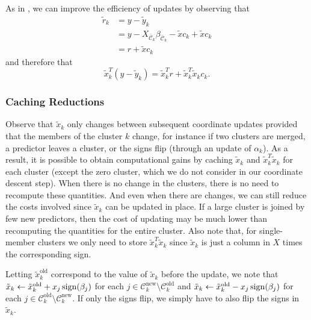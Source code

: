 As in \textcite{friedman2010}, we can improve the efficiency of updates by observing that
\begin{equation*}
  \begin{aligned}
    \tilde r_k & = y - \tilde y_k                                                                       \\
               & = y - X_{\bar{\mathcal{C}}_k}\beta_{\bar{\mathcal{C}}_k} - \tilde x c_k + \tilde x c_k \\
               & = r + \tilde x c_k
  \end{aligned}
\end{equation*}
and therefore that
\begin{equation}
  \label{eq:naive-update}
  \tilde x_k^T (y - \tilde y_k) = \tilde x_k^T r + \tilde x_k^T \tilde x_k c_k.
\end{equation}

\subsubsection{Caching Reductions}

Observe that \(\tilde x_k\) only changes between subsequent coordinate updates provided that the members of the cluster \(k\) change, for instance if two clusters are merged, a predictor leaves a cluster, or the signs flip (through an update of \(\alpha_k\)).
As a result, it is possible to obtain computational gains by caching \(\tilde x_k\) and \(\tilde x_k^T \tilde x_k\) for each cluster (except the zero cluster, which we do not consider in our coordinate descent step).
When there is no change in the clusters, there is no need to recompute these quantities.
And even when there are changes, we can still reduce the costs involved since \(\tilde x_k\) can be updated in place.
If a large cluster is joined by few new predictors, then the cost of updating may be much lower than recomputing the quantities for the entire cluster.
Also note that, for single-member clusters we only need to store \(\tilde x_k^T \tilde x_k\) since \(\tilde x_k\) is just a column in \(X\) times the corresponding sign.

Letting \(\tilde x_k^\text{old}\) correspond to the value of \(\tilde x_k\) before the update, we note that \(\tilde x_k \gets \tilde x_k^\text{old} + x_j \operatorname{sign}(\beta_j)\) for each \(j \in \mathcal{C}_k^\text{new} \setminus \mathcal{C}_k^\text{old}\) and \(\tilde x_k \gets \tilde x_k^\text{old} - x_j \operatorname{sign}(\beta_j)\) for each \(j \in \mathcal{C}_k^\text{old} \setminus \mathcal{C}_k^\text{new}\).
If only the signs flip, we simply have to also flip the signs in \(\tilde x_k\).

